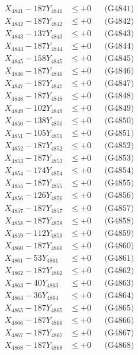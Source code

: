 \documentclass[a4paper,10pt]{article}
\begin{document}
{\begin{align}
\allowbreak
X_{4841} - 187Y_{4841} &\leq +0 && \text{(G4841)} \\
X_{4842} - 187Y_{4842} &\leq +0 && \text{(G4842)} \\
X_{4843} - 137Y_{4843} &\leq +0 && \text{(G4843)} \\
X_{4844} - 187Y_{4844} &\leq +0 && \text{(G4844)} \\
X_{4845} - 158Y_{4845} &\leq +0 && \text{(G4845)} \\
X_{4846} - 187Y_{4846} &\leq +0 && \text{(G4846)} \\
X_{4847} - 187Y_{4847} &\leq +0 && \text{(G4847)} \\
X_{4848} - 187Y_{4848} &\leq +0 && \text{(G4848)} \\
X_{4849} - 102Y_{4849} &\leq +0 && \text{(G4849)} \\
X_{4850} - 138Y_{4850} &\leq +0 && \text{(G4850)} \\
\allowbreak
X_{4851} - 105Y_{4851} &\leq +0 && \text{(G4851)} \\
X_{4852} - 187Y_{4852} &\leq +0 && \text{(G4852)} \\
X_{4853} - 187Y_{4853} &\leq +0 && \text{(G4853)} \\
X_{4854} - 174Y_{4854} &\leq +0 && \text{(G4854)} \\
X_{4855} - 187Y_{4855} &\leq +0 && \text{(G4855)} \\
X_{4856} - 126Y_{4856} &\leq +0 && \text{(G4856)} \\
X_{4857} - 187Y_{4857} &\leq +0 && \text{(G4857)} \\
X_{4858} - 187Y_{4858} &\leq +0 && \text{(G4858)} \\
X_{4859} - 112Y_{4859} &\leq +0 && \text{(G4859)} \\
X_{4860} - 187Y_{4860} &\leq +0 && \text{(G4860)} \\
\allowbreak
X_{4861} - 53Y_{4861} &\leq +0 && \text{(G4861)} \\
X_{4862} - 187Y_{4862} &\leq +0 && \text{(G4862)} \\
X_{4863} - 40Y_{4863} &\leq +0 && \text{(G4863)} \\
X_{4864} - 36Y_{4864} &\leq +0 && \text{(G4864)} \\
X_{4865} - 187Y_{4865} &\leq +0 && \text{(G4865)} \\
X_{4866} - 187Y_{4866} &\leq +0 && \text{(G4866)} \\
X_{4867} - 187Y_{4867} &\leq +0 && \text{(G4867)} \\
X_{4868} - 187Y_{4868} &\leq +0 && \text{(G4868)} \\

\end{align}}
\end{document}
